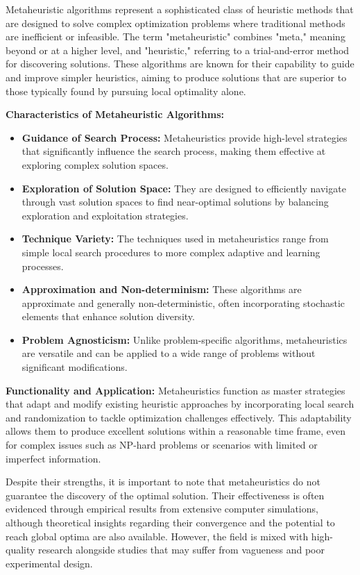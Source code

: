 \documentclass[
]{article}
\begin{document}
    Metaheuristic algorithms represent a sophisticated class of heuristic methods that are designed to solve complex optimization problems where traditional methods are inefficient or infeasible. The term "metaheuristic" combines "meta," meaning beyond or at a higher level, and "heuristic," referring to a trial-and-error method for discovering solutions. These algorithms are known for their capability to guide and improve simpler heuristics, aiming to produce solutions that are superior to those typically found by pursuing local optimality alone.

    \textbf{Characteristics of Metaheuristic Algorithms:}
    \begin{itemize}
        \item \textbf{Guidance of Search Process:} Metaheuristics provide high-level strategies that significantly influence the search process, making them effective at exploring complex solution spaces.
        \item \textbf{Exploration of Solution Space:} They are designed to efficiently navigate through vast solution spaces to find near-optimal solutions by balancing exploration and exploitation strategies.
        \item \textbf{Technique Variety:} The techniques used in metaheuristics range from simple local search procedures to more complex adaptive and learning processes.
        \item \textbf{Approximation and Non-determinism:} These algorithms are approximate and generally non-deterministic, often incorporating stochastic elements that enhance solution diversity.
        \item \textbf{Problem Agnosticism:} Unlike problem-specific algorithms, metaheuristics are versatile and can be applied to a wide range of problems without significant modifications.
    \end{itemize}

    \textbf{Functionality and Application:}
    Metaheuristics function as master strategies that adapt and modify existing heuristic approaches by incorporating local search and randomization to tackle optimization challenges effectively. This adaptability allows them to produce excellent solutions within a reasonable time frame, even for complex issues such as NP-hard problems or scenarios with limited or imperfect information.

    Despite their strengths, it is important to note that metaheuristics do not guarantee the discovery of the optimal solution. Their effectiveness is often evidenced through empirical results from extensive computer simulations, although theoretical insights regarding their convergence and the potential to reach global optima are also available. However, the field is mixed with high-quality research alongside studies that may suffer from vagueness and poor experimental design.
\end{document}
